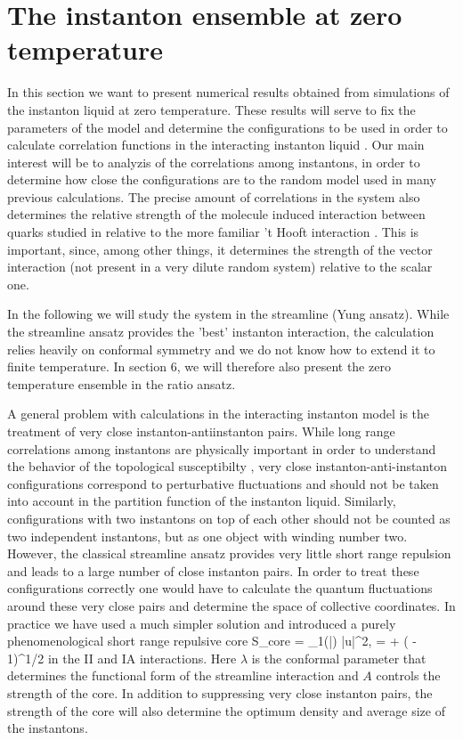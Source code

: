 \section{The instanton ensemble at zero temperature}

    In this section we want to present numerical results obtained
from simulations of the instanton liquid at zero temperature. These
results will serve to fix the parameters of the model and determine
the configurations to be used in order to calculate correlation
functions in the interacting instanton liquid \cite{SSV_95b}. Our main
interest will be to analyzis of the correlations among instantons, in
order to determine how close the configurations are to the random
model used in many previous calculations. The precise amount of
correlations in the system also determines the relative strength
of the molecule induced interaction between quarks studied
in \cite{SSV_95} relative to the more familiar 't Hooft interaction
\cite{tHo_76,SVZ_80}. This is important, since, among other things,
it determines the strength of the vector interaction (not present
in a very dilute random system) relative to the scalar one.

    In the following we will study the system in the streamline (Yung
ansatz). While the streamline ansatz provides the 'best' instanton
interaction, the calculation relies heavily on conformal symmetry and
we do not know how to extend it to finite temperature. In section 6,
we will therefore also present the zero temperature ensemble in the
ratio ansatz.

    A general problem with calculations in the interacting instanton
model is the treatment of very close instanton-antiinstanton pairs.
While long range correlations among instantons are physically
important in order to understand the behavior of the topological
susceptibilty \cite{SV_95,SS_95}, very close instanton-anti-instanton
configurations correspond to perturbative fluctuations
and should not be taken into account in the partition function of
the instanton liquid. Similarly, configurations with two instantons
on top of each other should not be counted as two independent instantons,
but as one object with winding number two.  However, the classical
streamline ansatz provides very little short range repulsion
and leads to a large number of close instanton pairs. In order to
treat these configurations correctly one would have to calculate
the quantum fluctuations around these very close pairs and determine
the space of collective coordinates. In practice we have used a
much simpler solution and introduced a purely phenomenological
short range repulsive core
\be
   S_{\rm core} = \beta_1(\bar\rho) 
   |u|^2, \hspace{1cm}
 \lambda = 
  + \left( 
   - 1\right)^{1/2}
\ee
in the II and IA interactions. Here $\lambda$ is the conformal
parameter that determines the functional form of the streamline
interaction \cite{Ver_91} and $A$ controls the strength of the
core. In addition to suppressing very close instanton pairs, the
strength of the core will also determine the optimum density and
average size of the instantons.

